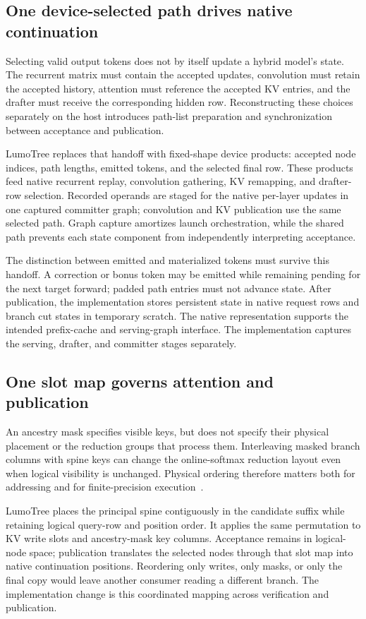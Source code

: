 \documentclass[conference]{IEEEtran}
\newcommand{\sys}{LumoTree}
\begin{document}
\subsection{One device-selected path drives native continuation}
Selecting valid output tokens does not by itself update a hybrid model's state. The recurrent matrix must contain the accepted updates, convolution must retain the accepted history, attention must reference the accepted KV entries, and the drafter must receive the corresponding hidden row. Reconstructing these choices separately on the host introduces path-list preparation and synchronization between acceptance and publication.

\sys{} replaces that handoff with fixed-shape device products: accepted node indices, path lengths, emitted tokens, and the selected final row. These products feed native recurrent replay, convolution gathering, KV remapping, and drafter-row selection. Recorded operands are staged for the native per-layer updates in one captured committer graph; convolution and KV publication use the same selected path. Graph capture amortizes launch orchestration, while the shared path prevents each state component from independently interpreting acceptance.

The distinction between emitted and materialized tokens must survive this handoff. A correction or bonus token may be emitted while remaining pending for the next target forward; padded path entries must not advance state. After publication, the implementation stores persistent state in native request rows and branch cut states in temporary scratch. The native representation supports the intended prefix-cache and serving-graph interface. The implementation captures the serving, drafter, and committer stages separately.

\subsection{One slot map governs attention and publication}
An ancestry mask specifies visible keys, but does not specify their physical placement or the reduction groups that process them. Interleaving masked branch columns with spine keys can change the online-softmax reduction layout even when logical visibility is unchanged. Physical ordering therefore matters both for addressing and for finite-precision execution~\cite{he2025determinism}.

\sys{} places the principal spine contiguously in the candidate suffix while retaining logical query-row and position order. It applies the same permutation to KV write slots and ancestry-mask key columns. Acceptance remains in logical-node space; publication translates the selected nodes through that slot map into native continuation positions. Reordering only writes, only masks, or only the final copy would leave another consumer reading a different branch. The implementation change is this coordinated mapping across verification and publication.
\end{document}
